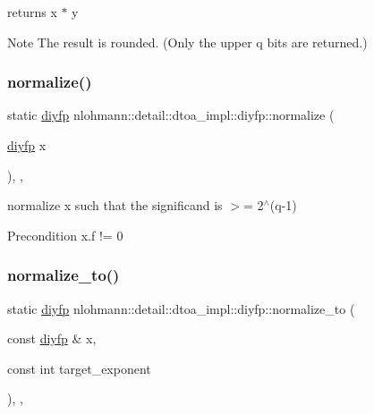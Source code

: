 returns x $\ast$ y 

\begin{DoxyNote}{Note}
The result is rounded. (Only the upper q bits are returned.) 
\end{DoxyNote}
\mbox{\label{structnlohmann_1_1detail_1_1dtoa__impl_1_1diyfp_a2246b5b40c7c6992153ef174063d6aa6}} 
\subsubsection{\texorpdfstring{normalize()}{normalize()}}
{\footnotesize\ttfamily static \mbox{\hyperlink{structnlohmann_1_1detail_1_1dtoa__impl_1_1diyfp}{diyfp}} nlohmann\+::detail\+::dtoa\+\_\+impl\+::diyfp\+::normalize (\begin{DoxyParamCaption}\item[{\mbox{\hyperlink{structnlohmann_1_1detail_1_1dtoa__impl_1_1diyfp}{diyfp}}}]{x }\end{DoxyParamCaption})\hspace{0.3cm}{\ttfamily [inline]}, {\ttfamily [static]}, {\ttfamily [noexcept]}}



normalize x such that the significand is $>$= 2$^\wedge$(q-\/1) 

\begin{DoxyPrecond}{Precondition}
x.\+f != 0 
\end{DoxyPrecond}
\mbox{\label{structnlohmann_1_1detail_1_1dtoa__impl_1_1diyfp_a6b6665e467ebabe0c0f7418d3fe4b118}} 
\subsubsection{\texorpdfstring{normalize\+\_\+to()}{normalize\_to()}}
{\footnotesize\ttfamily static \mbox{\hyperlink{structnlohmann_1_1detail_1_1dtoa__impl_1_1diyfp}{diyfp}} nlohmann\+::detail\+::dtoa\+\_\+impl\+::diyfp\+::normalize\+\_\+to (\begin{DoxyParamCaption}\item[{const \mbox{\hyperlink{structnlohmann_1_1detail_1_1dtoa__impl_1_1diyfp}{diyfp}} \&}]{x,  }\item[{const int}]{target\+\_\+exponent }\end{DoxyParamCaption})\hspace{0.3cm}{\ttfamily [inline]}, {\ttfamily [static]}, {\ttfamily [noexcept]}}



